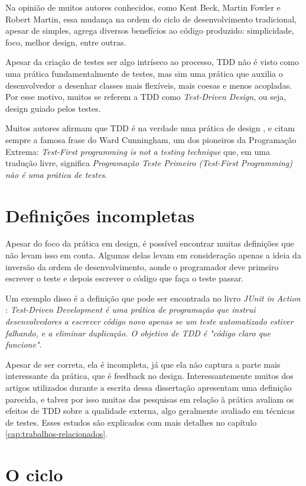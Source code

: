 Na opinião de muitos autores conhecidos, como Kent Beck, Martin Fowler e Robert
Martin, essa mudança na ordem do ciclo de desenvolvimento tradicional, apesar de
simples, agrega diversos benefícios ao código produzido: simplicidade, foco,
melhor design, entre outras.

Apesar da criação de testes ser algo intríseco ao processo, TDD não é visto como
uma prática fundamentalmente de testes, mas sim uma prática que auxilia o
desenvolvedor a desenhar classes mais flexíveis, mais coesas e menos acopladas.
Por esse motivo, muitos se referem a TDD como \textit{Test-Driven Design}, ou
seja, design guiado pelos testes.

Muitos autores afirmam que TDD é na verdade uma prática de design
\cite{tdd-taxonomy} \cite{aim-fire}, e citam sempre a famosa frase do Ward
Cunningham, um dos pioneiros da Programação Extrema: \textit{Test-First
programming is not a testing technique} que, em uma tradução livre, significa
\textit{Programação Teste Primeiro (Test-First Programming) não é uma prática
de testes}.

\section{Definições incompletas}

Apesar do foco da prática em design, é possível encontrar muitas definições que
não levam isso em conta. Algumas delas levam em consideração apenas a ideia da
inversão da ordem de desenvolvimento, aonde o programador deve primeiro escrever
o teste e depois escrever o código que faça o teste passar.

Um exemplo disso é a definição que pode ser encontrada no livro \textit{JUnit
in Action} \cite{junit-in-action}: \textit{Test-Driven Development é uma
prática de programação que instrui desenvolvedores a escrever código novo
apenas se um teste automatizado estiver falhando, e a eliminar duplicação. O
objetivo de TDD é "código claro que funcione"}.

Apesar de ser correta, ela é incompleta, já que ela não captura a parte mais
interessante da prática, que é feedback no design. Interessantemente muitos
dos artigos utilizados durante a escrita dessa dissertação apresentam uma
definição parecida, e talvez por isso muitas das pesquisas em relação à prática
avaliam os efeitos de TDD sobre a qualidade externa, algo geralmente avaliado em
técnicas de testes. Esses estudos são explicados com mais detalhes no capítulo
\ref{cap:trabalhos-relacionados}.

\section{O ciclo}


